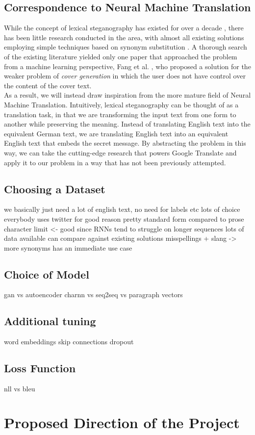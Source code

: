 \documentclass[11pt,a4paper]{article}
\begin{document}
\subsection *{Correspondence to Neural Machine Translation}
  While the concept of lexical steganography has existed for over a decade \cite{tlex}, there has been little research conducted in the area, with almost all existing solutions employing simple techniques based on synonym substitution \cite{universal}. A thorough search of the existing literature yielded only one paper that approached the problem from a machine learning perspective, Fang et al. \citeyear{lstm}, who proposed a solution for the weaker problem of \textit{cover generation} in which the user does not have control over the content of the cover text.\\
  \indent As a result, we will instead draw inspiration from the more mature field of Neural Machine Translation. Intuitively, lexical steganography can be thought of as a translation task, in that we are transforming the input text from one form to another while preserving the meaning. Instead of translating English text into the equivalent German text, we are translating English text into an equivalent English text that embeds the secret message. By abstracting the problem in this way, we can take the cutting-edge research that powers Google Translate and apply it to our problem in a way that has not been previously attempted.

\subsection *{Choosing a Dataset}
we basically just need a lot of english text, no need for labels etc
lots of choice 
everybody uses twitter for good reason
  pretty standard form compared to prose
  character limit <- good since RNNs tend to struggle on longer sequences
  lots of data available
  can compare against existing solutions
  misspellings + slang -> more synonyms
  has an immediate use case

\subsection *{Choice of Model}
  gan vs autoencoder
  charnn vs seq2seq vs paragraph vectors


\subsection *{Additional tuning}
  word embeddings
  skip connections
  dropout

\subsection *{Loss Function}
  nll vs bleu

\section *{Proposed Direction of the Project}

\bigskip



\end{document}
